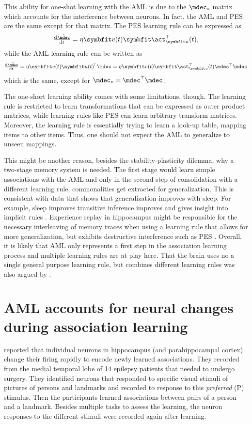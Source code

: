 This ability for one-shot learning with the AML is due to the $\mdec_*$ matrix which accounts for the interference between neurons.
In fact, the AML and PES are the same except for that matrix.
The PES learning rule can be expressed as
\begin{equation}
    \od{\tilde{\mdec}}{t} = \eta \vc v(t) \vc\act_{\vc u}\Tr(t) \text{,}
\end{equation}
while the AML learning rule can be written as
\begin{equation}
    \od{\tilde{\mdec}}{t} = \eta \vc v(t) \vc u(t)\!\Tr \mdec = \eta \vc v(t) \vc\act_{\vc u}\Tr(t) \mdec\Tr \mdec
\end{equation}
which is the same, except for $\mdec_* = \mdec\Tr \mdec$.

The one-short learning ability comes with some limitations, though.
The learning rule is restricted to learn transformations that can be expressed as outer product matrices, while learning rules like PES can learn arbitrary transform matrices.
Moreover, the learning rule is essentially trying to learn a look-up table, mapping items to other items.
Thus, one should not expect the AML to generalize to unseen mappings.

This might be another reason, besides the stability-plasticity dilemma, why a two-stage memory system is needed.
The first stage would learn simple associations with the AML and only in the second step of consolidation with a different learning rule, commonalities get extracted for generalization.
This is consistent with data that shows that generalization improves with sleep.
For example, sleep improves transitive inference improves \parencite{stickgold2013-2} and gives insight into implicit rules \parencite{wagner2004}.
Experience replay in hippocampus might be responsible for the necessary interleaving of memory traces when using a learning rule that allows for more generalization, but exhibits destructive interference such as PES \parencite{mcclelland1995-1,kumaran2016}.
Overall, it is likely that AML only represents a first step in the association learning process and multiple learning rules are at play here.
That the brain uses no a single general purpose learning rule, but combines different learning rules was also argued by \textcite{gallistel2009}.


\section{AML accounts for neural changes during association learning}\label{sec:aml-neural}
\Textcite{ison2015} reported that individual neurons in hippocampus (and parahippocampal cortex) change their firing rapidly to encode newly learned associations.
They recorded from the medial temporal lobe of \num{14} epilepsy patients that needed to undergo surgery.
They identified neurons that responded to specific visual stimuli of pictures of persons and landmarks and recorded to response to this \emph{preferred} (P) stimulus.
Then the participants learned associations between pairs of a person and a landmark.
Besides multiple tasks to assess the learning, the neuron responses to the different stimuli were recorded again after learning.

